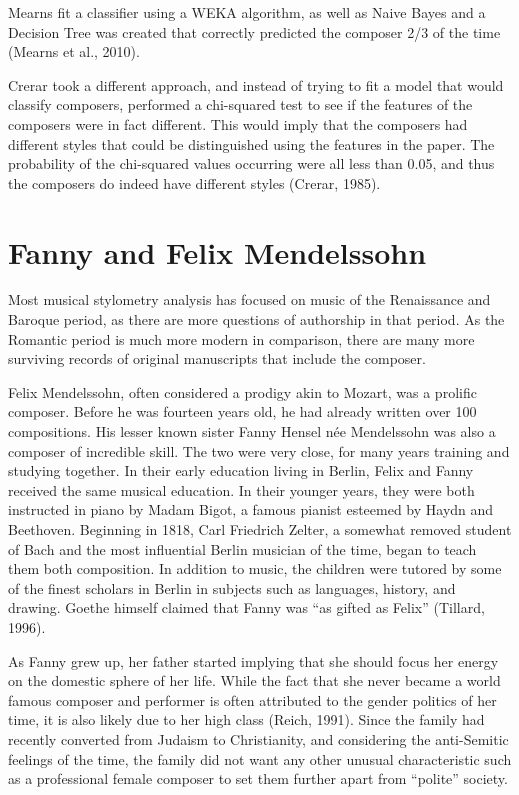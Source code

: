 \documentclass[12pt,twoside]{reedthesis}
\theoremstyle{definition}
\theoremstyle{definition}
\theoremstyle{definition}
\theoremstyle{remark}
\begin{document}
Mearns fit a classifier using a WEKA algorithm, as well as Naive Bayes
and a Decision Tree was created that correctly predicted the composer
2/3 of the time (Mearns et al., 2010).

Crerar took a different approach, and instead of trying to fit a model
that would classify composers, performed a chi-squared test to see if
the features of the composers were in fact different. This would imply
that the composers had different styles that could be distinguished
using the features in the paper. The probability of the chi-squared
values occurring were all less than 0.05, and thus the composers do
indeed have different styles (Crerar, 1985).

\section{Fanny and Felix Mendelssohn}\label{fanny-and-felix-mendelssohn}

Most musical stylometry analysis has focused on music of the Renaissance
and Baroque period, as there are more questions of authorship in that
period. As the Romantic period is much more modern in comparison, there
are many more surviving records of original manuscripts that include the
composer.

Felix Mendelssohn, often considered a prodigy akin to Mozart, was a
prolific composer. Before he was fourteen years old, he had already
written over 100 compositions. His lesser known sister Fanny Hensel née
Mendelssohn was also a composer of incredible skill. The two were very
close, for many years training and studying together. In their early
education living in Berlin, Felix and Fanny received the same musical
education. In their younger years, they were both instructed in piano by
Madam Bigot, a famous pianist esteemed by Haydn and Beethoven. Beginning
in 1818, Carl Friedrich Zelter, a somewhat removed student of Bach and
the most influential Berlin musician of the time, began to teach them
both composition. In addition to music, the children were tutored by
some of the finest scholars in Berlin in subjects such as languages,
history, and drawing. Goethe himself claimed that Fanny was ``as gifted
as Felix'' (Tillard, 1996).

As Fanny grew up, her father started implying that she should focus her
energy on the domestic sphere of her life. While the fact that she never
became a world famous composer and performer is often attributed to the
gender politics of her time, it is also likely due to her high class
(Reich, 1991). Since the family had recently converted from Judaism to
Christianity, and considering the anti-Semitic feelings of the time, the
family did not want any other unusual characteristic such as a
professional female composer to set them further apart from ``polite''
society.
\end{document}
